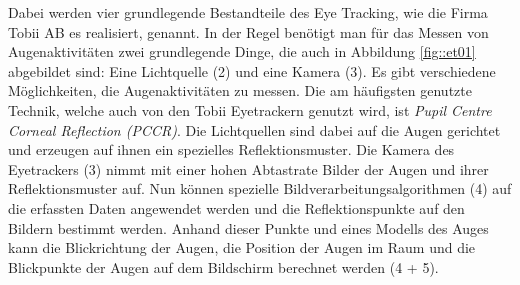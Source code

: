 Dabei werden vier grundlegende Bestandteile des Eye Tracking, wie die Firma Tobii AB es realisiert, genannt.
In der Regel benötigt man für das Messen von Augenaktivitäten zwei grundlegende Dinge, die auch in Abbildung \ref{fig::et01} abgebildet sind: Eine Lichtquelle (2) und eine Kamera (3).
Es gibt verschiedene Möglichkeiten, die Augenaktivitäten zu messen.
Die am häufigsten genutzte Technik, welche auch von den Tobii Eyetrackern genutzt wird, ist \emph{Pupil Centre Corneal Reflection (PCCR)}.
Die Lichtquellen sind dabei auf die Augen gerichtet und erzeugen auf ihnen ein spezielles Reflektionsmuster.
Die Kamera des Eyetrackers (3) nimmt mit einer hohen Abtastrate Bilder der Augen und ihrer Reflektionsmuster auf.
Nun können spezielle Bildverarbeitungsalgorithmen (4) auf die erfassten Daten angewendet werden und die Reflektionspunkte auf den Bildern bestimmt werden.
Anhand dieser Punkte und eines Modells des Auges kann die Blickrichtung der Augen, die Position der Augen im Raum und die Blickpunkte der Augen auf dem Bildschirm berechnet werden (4 + 5).

